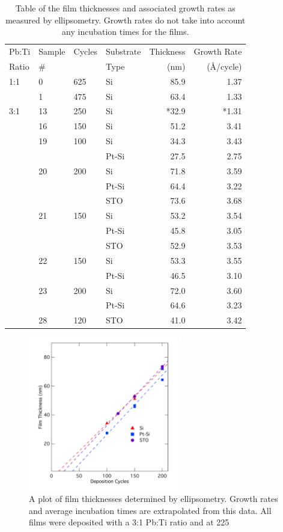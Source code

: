 \begin{table}[tbp]
	\centering
	\small
	\caption[Sample Thicknesses and Growth Rates]%
		{Table of the film thicknesses and associated growth rates as measured by ellipsometry. Growth rates do %
		not take into account any incubation times for the films.}
	\label{tbl:LoThicknesses}
	\begin{tabular}{llllrr}
		\toprule
		Pb:Ti		&Sample	&Cycles		&Substrate	&Thickness	&Growth Rate	\\
		Ratio	&\#		&			&Type		&(nm)		&(\AA/cycle)	\\ \midrule
		1:1		&0		&625		&Si			&85.9		&1.37		\\
				&1		&475		&Si			&63.4		&1.33		\\
		3:1		&13		&250		&Si			&*32.9		&*1.31		\\
				&16		&150		&Si			&51.2		&3.41		\\
				&19		&100		&Si			&34.3		&3.43		\\
				&		&			&Pt-Si		&27.5		&2.75		\\
				&20		&200		&Si			&71.8		&3.59		\\
				&		&			&Pt-Si		&64.4		&3.22		\\
				&		&			&STO		&73.6		&3.68		\\
				&21		&150		&Si			&53.2		&3.54		\\
				&		&			&Pt-Si		&45.8		&3.05		\\
				&		&			&STO		&52.9		&3.53		\\
				&22		&150		&Si			&53.3		&3.55		\\
				&		&			&Pt-Si		&46.5		&3.10		\\
				&23		&200		&Si			&72.0		&3.60		\\
				&		&			&Pt-Si		&64.6		&3.23		\\
				&28		&120		&STO		&41.0		&3.42		\\	
		\bottomrule
	\end{tabular}
\end{table}

\begin{figure}[tbp]
	\centering
	\includegraphics[width=0.6\textwidth]{./Figures/Data/Ellipsometry/Ellip-Rates}
	\caption[Film Thicknesses vs. Deposition Cycles]%
		{A plot of film thicknesses determined by ellipsometry. Growth rates and average incubation times are %
		extrapolated from this data. All films were deposited with a 3:1 Pb:Ti ratio and at 225\degC{}}
	\label{fig:Ellip-rates}
\end{figure}
	
